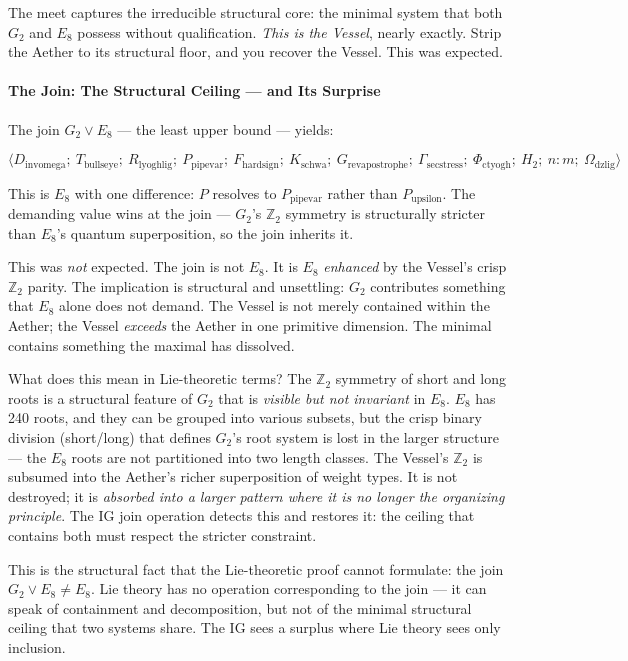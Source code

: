 \documentclass[12pt,a4paper]{article}
\begin{document}
The meet captures the irreducible structural core: the minimal system that both $G_2$ and $E_8$ possess without qualification. \emph{This is the Vessel}, nearly exactly. Strip the Aether to its structural floor, and you recover the Vessel. This was expected.

\paragraph{The Join: The Structural Ceiling --- and Its Surprise}

The join $G_2 \vee E_8$ --- the least upper bound --- yields:

\[\langle D_{\text{invomega}};\ T_{\text{bullseye}};\ R_{\text{lyoghlig}};\ P_{\text{pipevar}};\ F_{\text{hardsign}};\ K_{\text{schwa}};\ G_{\text{revapostrophe}};\ \Gamma_{\text{secstress}};\ \Phi_{\text{ctyogh}};\ H_2;\ n{:}m;\ \Omega_{\text{dzlig}} \rangle\]

This is $E_8$ with one difference: $P$ resolves to $P_{\text{pipevar}}$ rather than $P_{\text{upsilon}}$. The demanding value wins at the join --- $G_2$'s $\mathbb{Z}_2$ symmetry is structurally stricter than $E_8$'s quantum superposition, so the join inherits it.

This was \emph{not} expected. The join is not $E_8$. It is $E_8$ \emph{enhanced} by the Vessel's crisp $\mathbb{Z}_2$ parity. The implication is structural and unsettling: $G_2$ contributes something that $E_8$ alone does not demand. The Vessel is not merely contained within the Aether; the Vessel \emph{exceeds} the Aether in one primitive dimension. The minimal contains something the maximal has dissolved.

What does this mean in Lie-theoretic terms? The $\mathbb{Z}_2$ symmetry of short and long roots is a structural feature of $G_2$ that is \emph{visible but not invariant} in $E_8$. $E_8$ has 240 roots, and they can be grouped into various subsets, but the crisp binary division (short/long) that defines $G_2$'s root system is lost in the larger structure --- the $E_8$ roots are not partitioned into two length classes. The Vessel's $\mathbb{Z}_2$ is subsumed into the Aether's richer superposition of weight types. It is not destroyed; it is \emph{absorbed into a larger pattern where it is no longer the organizing principle}. The IG join operation detects this and restores it: the ceiling that contains both must respect the stricter constraint.

This is the structural fact that the Lie-theoretic proof cannot formulate: the join $G_2 \vee E_8 \neq E_8$. Lie theory has no operation corresponding to the join --- it can speak of containment and decomposition, but not of the minimal structural ceiling that two systems share. The IG sees a surplus where Lie theory sees only inclusion.
\end{document}
